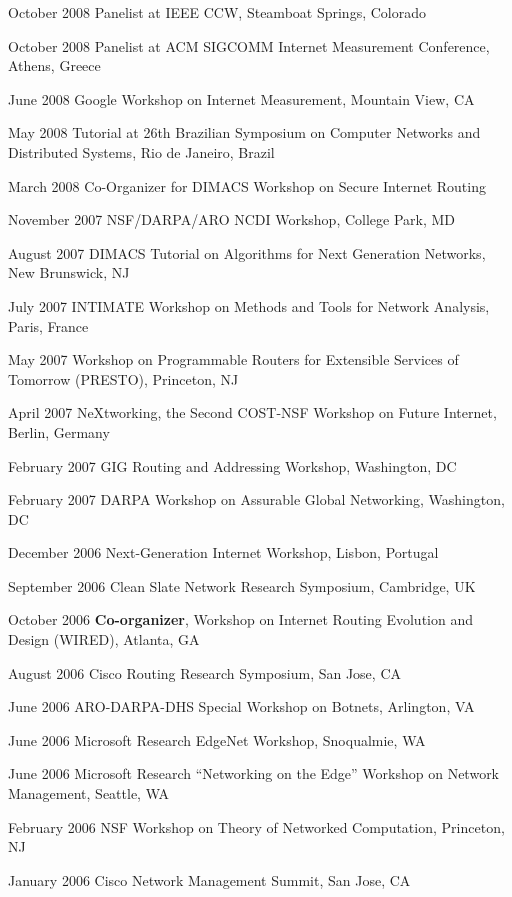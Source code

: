 \begin{cvlist}{}
\item[October 2008] {Panelist at IEEE CCW, Steamboat Springs, Colorado}\nw
\item[October 2008] {Panelist at ACM SIGCOMM Internet Measurement
  Conference, Athens, Greece}\nw
\item[June 2008] {Google Workshop on Internet Measurement, Mountain
  View, CA}\nw
\item[May 2008] {Tutorial at 26th Brazilian Symposium on Computer
  Networks and Distributed Systems, Rio de Janeiro, Brazil}\nw
\item[March 2008] {Co-Organizer for DIMACS Workshop on Secure Internet
  Routing}\nw
 \item[November 2007] {NSF/DARPA/ARO NCDI Workshop, College Park, MD}
\item[August 2007]{ DIMACS Tutorial on Algorithms for Next Generation
  Networks, New Brunswick, NJ}
\item[July 2007] {INTIMATE Workshop on Methods and Tools for Network
  Analysis, Paris, France}
\item[May 2007] {Workshop on Programmable Routers for Extensible
  Services of Tomorrow (PRESTO), Princeton, NJ}
\item[April 2007] {NeXtworking, the Second COST-NSF Workshop on
  Future Internet, Berlin, Germany}
\item[February 2007]{ GIG Routing and Addressing Workshop, Washington, DC}
\item[February 2007]{ DARPA Workshop on Assurable Global Networking,
  Washington, DC}
\item[December 2006]{ Next-Generation Internet Workshop, Lisbon, Portugal}
\item[September 2006]{ Clean Slate Network Research Symposium, Cambridge, UK}
\item[October 2006]{{\bf Co-organizer}, Workshop on Internet Routing Evolution
  and Design (WIRED), Atlanta, GA}
\item[August 2006]{ Cisco Routing Research Symposium, San Jose, CA}
\item[June 2006]{ ARO-DARPA-DHS Special Workshop on Botnets, Arlington, VA}
\item[June 2006]{ Microsoft Research EdgeNet Workshop, Snoqualmie, WA}
\item[June 2006]{ Microsoft Research ``Networking on the Edge'' Workshop
  on Network Management, Seattle, WA} 
\item[February 2006]{ NSF Workshop on Theory of Networked Computation,
  Princeton, NJ} 
\item[January 2006]{ Cisco Network Management Summit, San Jose, CA}
\end{cvlist}

